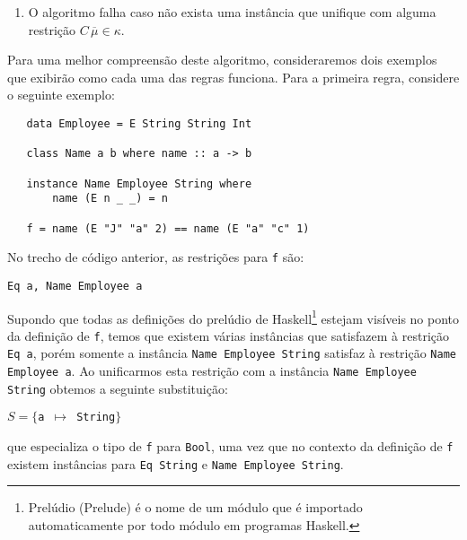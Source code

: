 \begin{enumerate}
\begin{equation*}
	         \begin{array}{ll}
	      		  \text{onde: } & S^{\prime} = unifyset(S\,T^{\prime})\\
	      		                & S = unify(\mu_{1},\mu_{2})
	      	 \end{array}
	      \end{equation*}
	      \emph{unify} \'e uma fun\c{c}\~ao que calcula o 
	      unificador mais geral de $\mu_{1},\mu_{2}$ e $\oplus$ denota a uni\~ao disjunta de dois conjuntos.
	      Nestas condi\c{c}\~oes, o algoritmo passa a ter como estado atual 
	      $(S^{\prime}\circ\,S,\,S^{\prime}\kappa^{\prime})$ onde $\kappa^{\prime}=\kappa - \{C\,\overline{\mu_{1}}\}$.
	\item O algoritmo falha caso n\~ao exista uma inst\^ancia 
	      que unifique com alguma restri\c{c}\~ao $C\,\overline{\mu}\in\kappa$.	      
\end{enumerate}

Para uma melhor compreens\~ao deste algoritmo, consideraremos dois exemplos que exibir\~ao como cada uma das regras 
funciona. Para a primeira regra, considere o seguinte exemplo:

\begin{verbatim}
   data Employee = E String String Int 
   
   class Name a b where name :: a -> b
   
   instance Name Employee String where
       name (E n _ _) = n
   
   f = name (E "J" "a" 2) == name (E "a" "c" 1) 
\end{verbatim}

No trecho de c\'odigo anterior, as restri\c{c}\~oes para \texttt{f} s\~ao:
\begin{center}
   \texttt{Eq a, Name Employee a}
\end{center}

Supondo que todas as defini\c{c}\~oes do prel\'udio de Haskell\footnote{Prel\'udio (Prelude) \'e o nome de um 
m\'odulo que \'e importado automaticamente por todo m\'odulo em programas Haskell.} estejam vis\'iveis no ponto da
defini\c{c}\~ao de \texttt{f}, temos que existem v\'arias inst\^ancias que satisfazem \`a restri\c{c}\~ao \texttt{Eq a},
por\'em somente a inst\^ancia \texttt{Name Employee String} satisfaz \`a restri\c{c}\~ao \texttt{Name Employee a}. Ao 
unificarmos esta restri\c{c}\~ao com a inst\^ancia \texttt{Name Employee String} obtemos a seguinte 
substitui\c{c}\~ao:
\begin{center}
 \texttt{$S=\{$a $\mapsto$ String$\}$} 
\end{center}
que especializa o tipo de \texttt{f} para \texttt{Bool}, uma vez que no contexto da defini\c{c}\~ao de \texttt{f} 
existem inst\^ancias para \texttt{Eq String} e \texttt{Name Employee String}.

